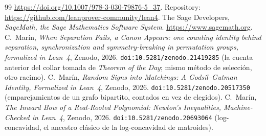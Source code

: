 \documentclass[11pt]{article}
\begin{document}
\begin{thebibliography}{99}
\url{https://doi.org/10.1007/978-3-030-79876-5_37}. Repository:
\url{https://github.com/leanprover-community/lean4}.
 The Sage Developers, \emph{SageMath, the Sage Mathematics Software System}.
\url{https://www.sagemath.org}.
 C.~Mar\'in, \emph{When Separation Fails, a Canon Appears: one counting identity
behind separation, synchronization and symmetry-breaking in permutation groups, formalized in
Lean~4}, Zenodo, 2026. \texttt{doi:10.5281/zenodo.21419285} (la cuenta anterior del collar
tomada de \emph{Theorem of the Day}; mismo método de selección, otro racimo).
 C.~Mar\'in, \emph{Random Signs into Matchings: A Godsil--Gutman Identity,
Formalized in Lean~4}, Zenodo, 2026. \texttt{doi:10.5281/zenodo.20517350} (emparejamientos de un grafo
bipartito, contados en vez de elegidos).
 C.~Mar\'in, \emph{The Inward Bow of a Real-Rooted Polynomial: Newton's
Inequalities, Machine-Checked in Lean~4}, Zenodo, 2026. \texttt{doi:10.5281/zenodo.20693064}
(log-concavidad, el ancestro clásico de la log-concavidad de matroides).
\end{thebibliography}
\end{document}
